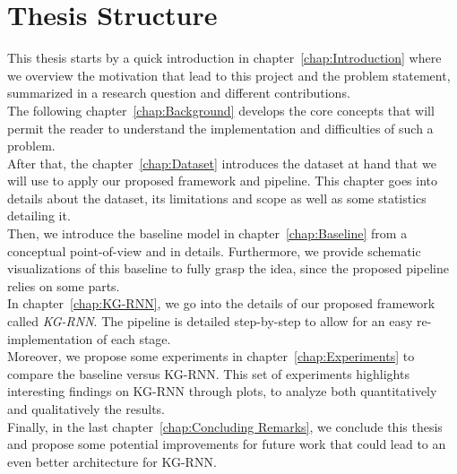 \section{Thesis Structure}
\label{sec:Thesis Structure}
This thesis starts by a quick introduction in chapter~\ref{chap:Introduction} where we overview the motivation that lead to this project and the problem statement, summarized in a research question and different contributions. \\
The following chapter~\ref{chap:Background} develops the core concepts that will permit the reader to understand the implementation and difficulties of such a problem. \\
After that, the chapter~\ref{chap:Dataset} introduces the dataset at hand that we will use to apply our proposed framework and pipeline. This chapter goes into details about the dataset, its limitations and scope as well as some statistics detailing it. \\
Then, we introduce the baseline model in chapter~\ref{chap:Baseline} from a conceptual point-of-view and in details. Furthermore, we provide schematic visualizations of this baseline to fully grasp the idea, since the proposed pipeline relies on some parts. \\
In chapter~\ref{chap:KG-RNN}, we go into the details of our proposed framework called \emph{KG-RNN}. The pipeline is detailed step-by-step to allow for an easy re-implementation of each stage. \\
Moreover, we propose some experiments in chapter~\ref{chap:Experiments} to compare the baseline versus KG-RNN. This set of experiments highlights interesting findings on KG-RNN through plots, to analyze both quantitatively and qualitatively the results.\\
Finally, in the last chapter~\ref{chap:Concluding Remarks}, we conclude this thesis and propose some potential improvements for future work that could lead to an even better architecture for KG-RNN.
